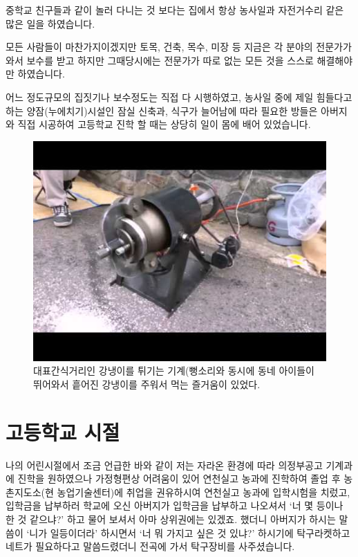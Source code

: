 \documentclass[chapter,book,openany,twoside]{oblivoir}
\begin{document}
중학교 친구들과 같이 놀러 다니는 것 보다는 집에서 항상 농사일과 자전거수리 같은 많은 일을 하였습니다.

모든 사람들이 마찬가지이겠지만 토목, 건축, 목수, 미장 등 지금은 각 분야의 전문가가 와서 보수를 받고 하지만 그때당시에는 전문가가 따로 없는 모든 것을 스스로 해결해야만 하였습니다.

어느 정도규모의 집짓기나 보수정도는 직접 다 시행하였고, 농사일 중에 제일 힘들다고 하는 양잠(누에치기)시설인 잠실 신축과, 식구가 늘어남에 따라 필요한 방들은 아버지와 직접 시공하여 고등학교 진학 할 때는 상당히 일이 몸에 배어 있었습니다.


\begin{figure}[b]
\centering \includegraphics[scale=0.6, trim={1cm 1.8cm 1cm 1.7cm},clip]{DBs/pic/003.jpg}
\caption{ 대표간식거리인 강냉이를 튀기는 기계(뻥소리와 동시에 동네 아이들이 뛰어와서 흩어진 강냉이를 주워서 먹는 즐거움이 있었다.}
\end{figure}



\chapter{고등학교 시절}

나의 어린시절에서 조금 언급한 바와 같이 저는 자라온 환경에 따라 의정부공고 기계과에 진학을 원하였으나 가정형편상 어려움이 있어 연천실고 농과에 진학하여 졸업 후 농촌지도소(현 농업기술센터)에 취업을 권유하시여 연천실고 농과에 입학시험을 치렀고, 입학금을 납부하러 학교에 오신 아버지가 입학금을 납부하고 나오셔서 `너 몇 등이나 한 것 같으냐?' 하고 물어 보셔서 아마 상위권에는 있겠죠. 했더니 아버지가 하시는 말씀이 `니가 일등이더라' 하시면서 `너 뭐 가지고 싶은 것 있냐?' 하시기에 탁구라켓하고 네트가 필요하다고 말씀드렸더니 전곡에 가서 탁구장비를 사주셨습니다.
\end{document}
